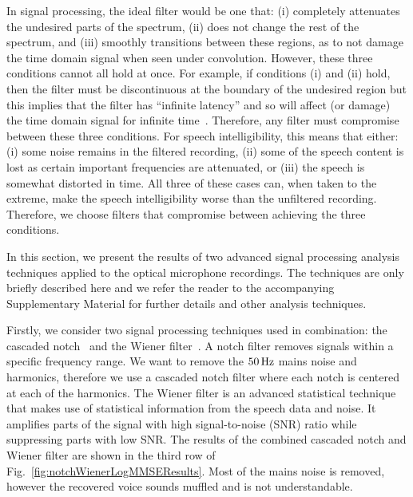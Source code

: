 \documentclass[paper-main.tex]{subfiles}
\begin{document}
In signal processing, the ideal filter would be one that:
(i) completely attenuates the undesired parts of the spectrum, 
(ii) does not change the rest of the spectrum, and 
(iii) smoothly transitions between these regions, as to not damage the time domain signal when seen under convolution. 
However, these three conditions cannot all hold at once. For example, if conditions (i) and (ii) hold, then the filter must be discontinuous at the boundary of the undesired region but this implies that the filter has ``infinite latency'' and so will affect (or damage) the time domain signal for infinite time~\cite{10.5555/151045}. Therefore, any filter must compromise between these three conditions. For speech intelligibility, this means that either: (i) some noise remains in the filtered recording, (ii) some of the speech content is lost as certain important frequencies are attenuated, or (iii) the speech is somewhat distorted in time.
All three of these cases can, when taken to the extreme, make the speech intelligibility worse than the unfiltered recording. 
Therefore, we choose filters that compromise between achieving the three conditions.


In this section, we present the results of two advanced signal processing analysis techniques applied to the optical microphone recordings. 
The techniques are only briefly described here and we refer the reader to the accompanying Supplementary Material for further details and other analysis techniques. 


Firstly, we consider two signal processing techniques used in combination: the cascaded notch~\cite{10.5555/541204} and the Wiener filter~\cite{10.5555/151045}. 
A notch filter removes signals within a specific frequency range. 
We want to remove the $50\,{\rm Hz}$ mains noise and harmonics, therefore we use a cascaded notch filter where each notch is centered at each of the harmonics. 
The Wiener filter is an advanced statistical technique that makes use of statistical information from the speech data and noise. 
It amplifies parts of the signal with high signal-to-noise (SNR) ratio while suppressing parts with low SNR. 
The results of the combined cascaded notch and Wiener filter are shown in the third row of Fig.~\ref{fig:notchWienerLogMMSEResults}. 
Most of the mains noise is removed, however the recovered voice sounds muffled and is not understandable. 
\end{document}
